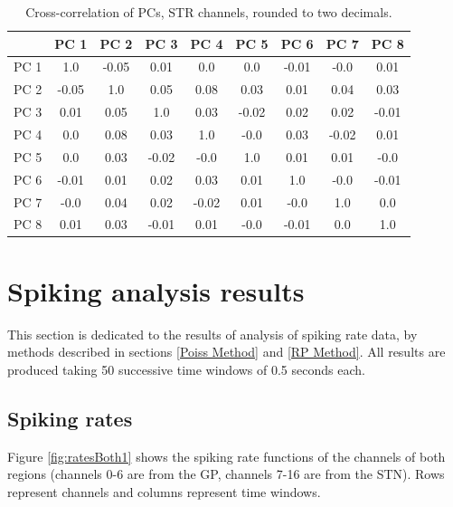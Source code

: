 \documentclass{kththesis}
\begin{document}
\begin{table}[H]
    \centering
    \begin{tabular}{|c|c|c|c|c|c|c|c|c|}
    \hline
          &  PC 1 &  PC 2 &  PC 3 &  PC 4 &  PC 5 &  PC 6 &  PC 7 &  PC 8 \\ \hline
     PC 1 &  1.0  & -0.05 &  0.01 &  0.0  &  0.0  & -0.01 & -0.0  &  0.01 \\ \hline
     PC 2 & -0.05 &  1.0  &  0.05 &  0.08 &  0.03 &  0.01 &  0.04 &  0.03 \\ \hline
     PC 3 &  0.01 &  0.05 &  1.0  &  0.03 & -0.02 &  0.02 &  0.02 & -0.01 \\ \hline
     PC 4 &  0.0  &  0.08 &  0.03 &  1.0  & -0.0  &  0.03 & -0.02 &  0.01 \\ \hline
     PC 5 &  0.0  &  0.03 & -0.02 & -0.0  &  1.0  &  0.01 &  0.01 & -0.0  \\ \hline
     PC 6 & -0.01 &  0.01 &  0.02 &  0.03 &  0.01 &  1.0 &  -0.0  & -0.01 \\ \hline
     PC 7 & -0.0  &  0.04 &  0.02 & -0.02 &  0.01 & -0.0 &   1.0  &  0.0  \\ \hline
     PC 8 &  0.01 &  0.03 & -0.01 &  0.01 & -0.0  & -0.01 &  0.0  &  1.0  \\ \hline
    \end{tabular}
    \caption{Cross-correlation of PCs, STR channels, rounded to two decimals.}
    \label{tab:corrcoefSTR}
\end{table}

\section{Spiking analysis results}

This section is dedicated to the results of analysis of spiking rate data, by methods described in sections \ref{Poiss Method} and \ref{RP Method}.
All results are produced taking 50 successive time windows of 0.5 seconds each.

\subsection{Spiking rates}

Figure \ref{fig:ratesBoth1} shows the spiking rate functions of the channels of both regions (channels 0-6 are from the GP, channels 7-16 are from the STN). Rows represent channels and columns represent time windows. 
\end{document}
